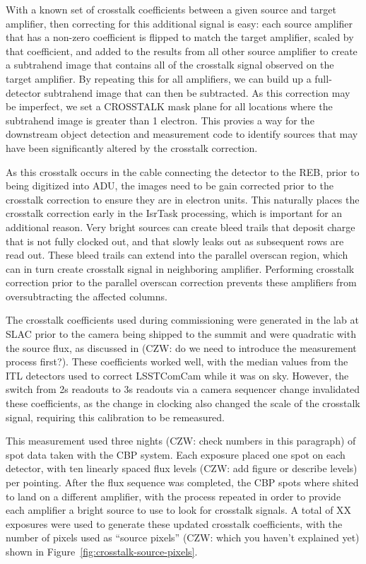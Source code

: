 With a known set of crosstalk coefficients between a given source and target amplifier, then correcting for this additional signal is easy: each source amplifier that has a non-zero coefficient is flipped to match the target amplifier, scaled by that coefficient, and added to the results from all other source amplifier to create a subtrahend image that contains all of the crosstalk signal observed on the target amplifier.
By repeating this for all amplifiers, we can build up a full-detector subtrahend image that can then be subtracted.
As this correction may be imperfect, we set a CROSSTALK mask plane for all locations where the subtrahend image is greater than 1 electron.
This provies a way for the downstream object detection and measurement code to identify sources that may have been significantly altered by the crosstalk correction.

As this crosstalk occurs in the cable connecting the detector to the REB, prior to being digitized into ADU, the images need to be gain corrected prior to the crosstalk correction to ensure they are in electron units.
This naturally places the crosstalk correction early in the IsrTask processing, which is important for an additional reason.
Very bright sources can create bleed trails that deposit charge that is not fully clocked out, and that slowly leaks out as subsequent rows are read out.
These bleed trails can extend into the parallel overscan region, which can in turn create crosstalk signal in neighboring amplifier.
Performing crosstalk correction prior to the parallel overscan correction prevents these amplifiers from oversubtracting the affected columns.

The crosstalk coefficients used during commissioning were generated in the lab at SLAC prior to the camera being shipped to the summit and were quadratic with the source flux, as discussed in \citet{2021JATIS...7d48002S} (CZW: do we need to introduce the measurement process first?).
These coefficients worked well, with the median values from the ITL detectors used to correct LSSTComCam while it was on sky.
However, the switch from 2s readouts to 3s readouts via a camera sequencer change invalidated these coefficients, as the change in clocking also changed the scale of the crosstalk signal, requiring this calibration to be remeasured.

This measurement used three nights (CZW: check numbers in this paragraph) of spot data taken with the CBP system.
Each exposure placed one spot on each detector, with ten linearly spaced flux levels (CZW: add figure or describe levels) per pointing.
After the flux sequence was completed, the CBP spots where shited to land on a different amplifier, with the process repeated in order to provide each amplifier a bright source to use to look for crosstalk signals.
A total of XX exposures were used to generate these updated crosstalk coefficients, with the number of pixels used as ``source pixels'' (CZW: which you haven't explained yet) shown in Figure~\ref{fig:crosstalk-source-pixels}.

